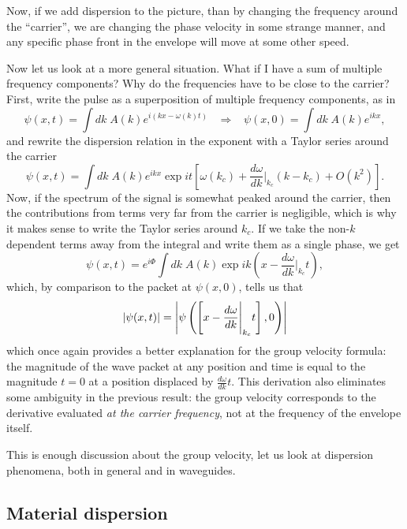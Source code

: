 Now, if we add dispersion to the picture, than by changing the frequency around the ``carrier'', we are changing the phase velocity in some strange manner, and any specific phase front in the envelope will move at some other speed.

Now let us look at a more general situation. What if I have a sum of multiple frequency components? Why do the frequencies have to be close to the carrier? First, write the pulse as a superposition of multiple frequency components, as in
\begin{equation}
    \psi(x,t)=\int dk\;A(k)e^{i(kx-\omega(k)t)}\;\;\;\Rightarrow\;\;\;\psi(x,0)=\int dk\;A(k)e^{ikx},
\end{equation}
and rewrite the dispersion relation in the exponent with a Taylor series around the carrier
\begin{equation}
    \psi(x,t)=\int dk\;A(k)e^{ikx}\exp it\left[\omega(k_c)+\frac{d\omega}{dk}\Biggr|_{k_c}(k-k_c)+O(k^2)\right].
\end{equation}
Now, if the spectrum of the signal is somewhat peaked around the carrier, then the contributions from terms very far from the carrier is negligible, which is why it makes sense to write the Taylor series around $k_c$. If we take the non-$k$ dependent terms away from the integral and write them as a single phase, we get
\begin{equation}
    \psi(x,t)=e^{i\Phi}\int dk\;A(k)\exp{ik\left(x-\frac{d\omega}{dk}\Biggr|_{k_c}t\right)},
\end{equation}
which, by comparison to the packet at $\psi(x,0)$, tells us that
\begin{equation}
    \abs{\psi(x,t)}=\abs{\psi\left(\left[x-\frac{d\omega}{dk}\Biggr|_{k_c}t\right],0\right)}
\end{equation}
which once again provides a better explanation for the group velocity formula: the magnitude of the wave packet at any position and time is equal to the magnitude $t=0$ at a position displaced by $\frac{d\omega}{dk}t$. This derivation also eliminates some ambiguity in the previous result: the group velocity corresponds to the derivative evaluated \textit{at the carrier frequency}, not at the frequency of the envelope itself.

This is enough discussion about the group velocity, let us look at dispersion phenomena, both in general and in waveguides.

\subsection{Material dispersion}

